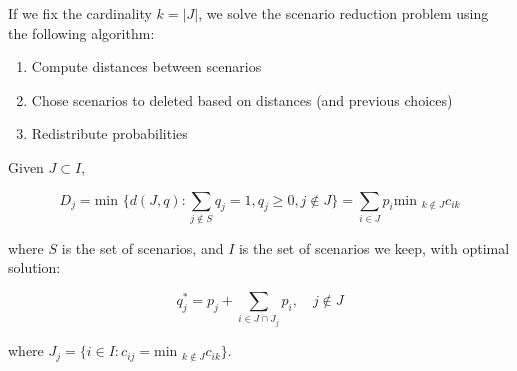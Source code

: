If we fix the cardinality $k = |J|$, we solve the scenario reduction problem using the
following algorithm:\\

\begin{enumerate}
\item Compute distances between scenarios 
\item Chose scenarios to deleted based on distances (and previous choices)
\item Redistribute probabilities
\end{enumerate}


\begin{thm}\hfill\break
Given $J \subset I$, 

\[
D_j = \text{min  } \{ d(J, q) : \sum_{j \notin S} q_j = 1, q_j \geq 0,
j \notin J \} = \sum_{i\in J} p_i \textrm{min }_{k\notin J} c_{ik}
\]

where $S$ is the set of scenarios, and $I$ is the set of scenarios we keep, with
optimal solution:

\[
q_j^{*} = p_j + \sum_{i \in J \cap J_j} p_i, \quad j\notin J
\]

where $ J_j = \{ i \in I : c_{ij} = \text{min  }_{k \notin J} c_{ik} \}$.
\end{thm}

